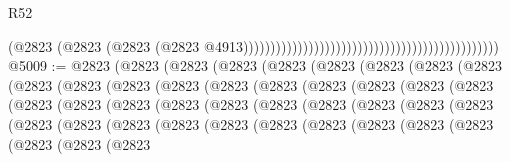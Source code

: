 \begin{lexlean}{R52}
\begin{coremodule}
                                                                                          (@2823
                                                                                            (@2823
                                                                                              (@2823
                                                                                                (@2823
                                                                                                  @4913)))))))))))))))))))))))))))))))))))))))))))))))
@5009 := @2823
    (@2823
      (@2823
        (@2823
          (@2823
            (@2823
              (@2823
                (@2823
                  (@2823
                    (@2823
                      (@2823
                        (@2823
                          (@2823
                            (@2823
                              (@2823
                                (@2823
                                  (@2823
                                    (@2823
                                      (@2823
                                        (@2823
                                          (@2823
                                            (@2823
                                              (@2823
                                                (@2823
                                                  (@2823
                                                    (@2823
                                                      (@2823
                                                        (@2823
                                                          (@2823
                                                            (@2823
                                                              (@2823
                                                                (@2823
                                                                  (@2823
                                                                    (@2823
                                                                      (@2823
                                                                        (@2823
                                                                          (@2823
                                                                            (@2823
                                                                              (@2823
                                                                                (@2823
                                                                                  (@2823
                                                                                    (@2823

\end{coremodule}
\end{lexlean}
